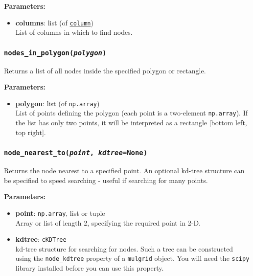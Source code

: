 \textbf{Parameters:}
\begin{itemize}
\item \textbf{columns}: list (of \hyperref[columnobjects]{\texttt{column}})\\
  List of columns in which to find nodes.
\end{itemize}

\begin{snugshade}\subsubsection{\texttt{nodes\_in\_polygon(\emph{polygon})}}\end{snugshade}
\label{sec:mulgrid:nodes_in_polygon}

Returns a list of all nodes inside the specified polygon or rectangle.

\textbf{Parameters:}
\begin{itemize}
\item \textbf{polygon}: list (of \texttt{np.array})\\
  List of points defining the polygon (each point is a two-element \texttt{np.array}).  If the list has only two points, it will be interpreted as a rectangle [bottom left, top right].
\end{itemize}

\begin{snugshade}\subsubsection{\texttt{node\_nearest\_to(\emph{point}, \emph{kdtree}=None)}}\end{snugshade}
\label{sec:mulgrid:node_nearest_to}

Returns the node nearest to a specified point.  An optional kd-tree structure can be specified to speed searching - useful if searching for many points.

\textbf{Parameters:}
\begin{itemize}
\item \textbf{point}:  \texttt{np.array}, list or tuple\\
  Array or list of length 2, specifying the required point in 2-D.
\item \textbf{kdtree}:  \texttt{cKDTree}\\
  kd-tree structure for searching for nodes.  Such a tree can be constructed using the \texttt{node\_kdtree} property of a \texttt{mulgrid} object.  You will need the \texttt{scipy} library installed before you can use this property.
\end{itemize}

